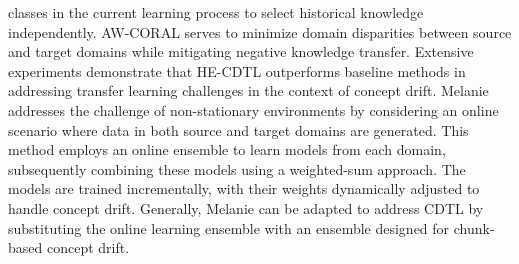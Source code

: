classes in the current learning process to select historical knowledge independently. AW-CORAL serves to minimize domain disparities between source and target domains while mitigating negative knowledge transfer. Extensive experiments demonstrate that HE-CDTL outperforms baseline methods in addressing transfer learning challenges in the context of concept drift.
Melanie addresses the challenge of non-stationary environments by considering an online scenario where data in both source and target domains are generated. This method employs an online ensemble to learn models from each domain, subsequently combining these models using a weighted-sum approach. The models are trained incrementally, with their weights dynamically adjusted to handle concept drift. Generally, Melanie can be adapted to address CDTL by substituting the online learning ensemble with an ensemble designed for chunk-based concept drift.

